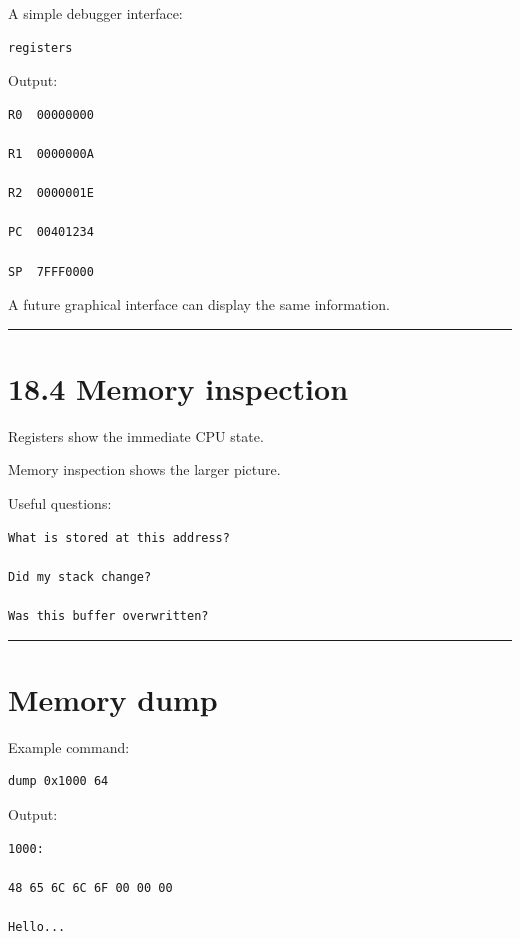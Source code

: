 \documentclass[
  oneside,
  openany]{book}
\begin{document}
A simple debugger interface:

\begin{verbatim}
registers
\end{verbatim}

Output:

\begin{verbatim}
R0  00000000

R1  0000000A

R2  0000001E

PC  00401234

SP  7FFF0000
\end{verbatim}

A future graphical interface can display the same information.

\begin{center}\rule{0.5\linewidth}{0.5pt}\end{center}

\hypertarget{memory-inspection}{%
\section{18.4 Memory inspection}\label{memory-inspection}}

Registers show the immediate CPU state.

Memory inspection shows the larger picture.

Useful questions:

\begin{verbatim}
What is stored at this address?

Did my stack change?

Was this buffer overwritten?
\end{verbatim}

\begin{center}\rule{0.5\linewidth}{0.5pt}\end{center}

\hypertarget{memory-dump}{%
\section{Memory dump}\label{memory-dump}}

Example command:

\begin{verbatim}
dump 0x1000 64
\end{verbatim}

Output:

\begin{verbatim}
1000:

48 65 6C 6C 6F 00 00 00

Hello...
\end{verbatim}
\end{document}
